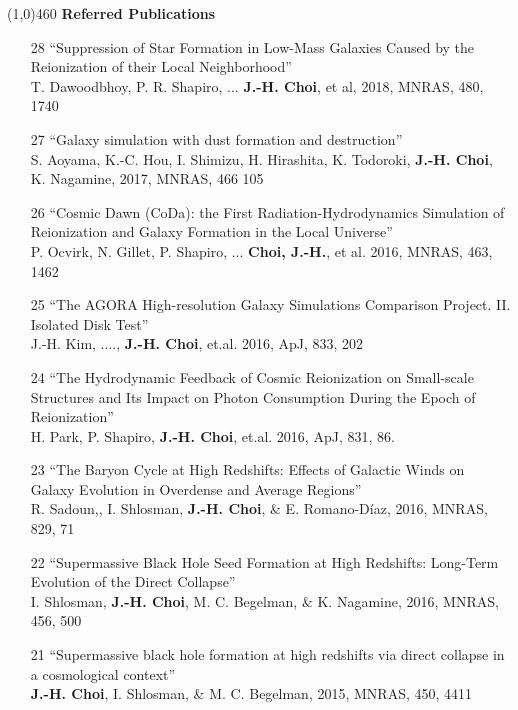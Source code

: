 \documentclass [11pt]{article}
\begin{document}
{{\line(1,0){460}
\vspace{.1in}
\noindent
{\textbf{Referred Publications}}
\begin{enumerate}

\item[28] ``Suppression of Star Formation in Low-Mass Galaxies Caused by the Reionization of their Local Neighborhood''\\ T. Dawoodbhoy, P. R. Shapiro, ... \textbf{J.-H. Choi}, et al, 2018, MNRAS, 480, 1740
  
\item[27] ``Galaxy simulation with dust formation and destruction''\\ S. Aoyama, K.-C. Hou, I. Shimizu, H. Hirashita, K. Todoroki, \textbf{J.-H. Choi}, K. Nagamine, 2017, MNRAS, 466 105
  
\item[26] ``Cosmic Dawn (CoDa): the First Radiation-Hydrodynamics Simulation of Reionization and Galaxy Formation in the Local Universe''\\ P. Ocvirk, N. Gillet, P. Shapiro, ... \textbf{Choi, J.-H.}, et al. 2016, MNRAS, 463, 1462

\item[25] ``The AGORA High-resolution Galaxy Simulations Comparison Project. II. Isolated Disk Test''\\ J.-H. Kim, ...., \textbf{J.-H. Choi}, et.al. 2016, ApJ, 833, 202

\item[24] ``The Hydrodynamic Feedback of Cosmic Reionization on Small-scale Structures and Its Impact on Photon Consumption During the Epoch of Reionization''\\ H. Park, P. Shapiro, \textbf{J.-H. Choi}, et.al. 2016, ApJ, 831, 86.
    
\item[23] ``The Baryon Cycle at High Redshifts: Effects of Galactic Winds on Galaxy Evolution in Overdense and Average Regions''\\ R. Sadoun,, I. Shlosman, \textbf{J.-H. Choi}, \& E. Romano-D\'{i}az, 2016, MNRAS, 829, 71

\item[22] ``Supermassive Black Hole Seed Formation at High Redshifts: Long-Term Evolution of the Direct Collapse''\\ I. Shlosman, \textbf{J.-H. Choi}, M. C. Begelman, \& K. Nagamine, 2016, MNRAS, 456, 500

\item[21] ``Supermassive black hole formation at high redshifts via direct collapse in a cosmological context'' \\  \textbf{J.-H. Choi}, I. Shlosman, \& M. C. Begelman, 2015, MNRAS, 450, 4411


\end{enumerate}}}
\end{document}
